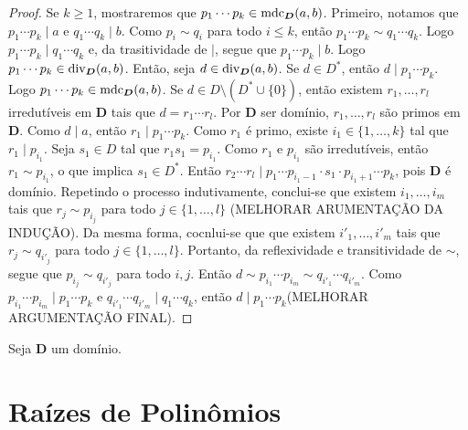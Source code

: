 \begin{proof}
	Se $k \geq 1$, mostraremos que $p_1 \cdots p_k \in \operatorname{mdc}_{\bm D}(a,b)$. Primeiro, notamos que $p_1 \cdots p_k \mid a$ e $q_1 \cdots q_k \mid b$. Como $p_i \sim q_i$ para todo $i \leq k$, então $p_1 \cdots p_k \sim q_1 \cdots q_k$. Logo $p_1 \cdots p_k \mid q_1 \cdots q_k$ e, da trasitividade de $\mid$, segue que $p_1 \cdots p_k \mid b$. Logo $p_1 \cdots p_k \in \operatorname{div}_{\bm D}(a,b)$. Então, seja $d \in \operatorname{div}_{\bm D}(a,b)$. Se $d \in D^*$, então $d \mid p_1 \cdots p_k$. Logo $p_1 \cdots p_k \in \operatorname{mdc}_{\bm D}(a,b)$. Se $d \in D \setminus (D^* \cup \{0\})$, então existem $r_1,\ldots,r_l$ irredutíveis em $\bm D$ tais que $d = r_1 \cdots r_l$. Por $\bm D$ ser domínio, $r_1,\ldots,r_l$ são primos em $\bm D$. Como $d \mid a$, então $r_1 \mid p_1 \cdots p_k$. Como $r_1$ é primo, existe $i_1 \in \{1,\ldots,k\}$ tal que $r_1 \mid p_{i_1}$. Seja $s_1 \in D$ tal que $r_1s_1 = p_{i_1}$. Como $r_1$ e $p_{i_1}$ são irredutíveis, então $r_1 \sim p_{i_1}$, o que implica $s_1 \in D^*$. Então $r_2 \cdots r_l \mid p_1 \cdots p_{i_1-1} \cdot s_1 \cdot p_{i_1+1} \cdots p_k$, pois $\bm D$ é domínio. Repetindo o processo indutivamente, conclui-se que existem $i_1, \ldots,i_m$ tais que $r_j \sim p_{i_j}$ para todo $j \in \{1,\ldots,l\}$ (MELHORAR ARUMENTAÇÃO DA INDUÇÃO). Da mesma forma, cocnlui-se que que existem $i'_1, \ldots,i'_m$ tais que $r_j \sim q_{i'_j}$ para todo $j \in \{1,\ldots,l\}$. Portanto, da reflexividade e transitividade de $\sim$, segue que $p_{i_j} \sim q_{i'_j}$ para todo $i,j$. Então $d \sim p_{i_1} \cdots p_{i_m} \sim q_{i'_1} \cdots q_{i'_m}$. Como $p_{i_1} \cdots p_{i_m} \mid p_1 \cdots p_k$ e $q_{i'_1} \cdots q_{i'_m} \mid q_1 \cdots q_k$, então $d \mid p_1 \cdots p_k$(MELHORAR ARGUMENTAÇÃO FINAL).
\end{proof}

\begin{lema}
	Seja $\bm D$ um domínio.
\end{lema}

\section{Raízes de Polinômios}

